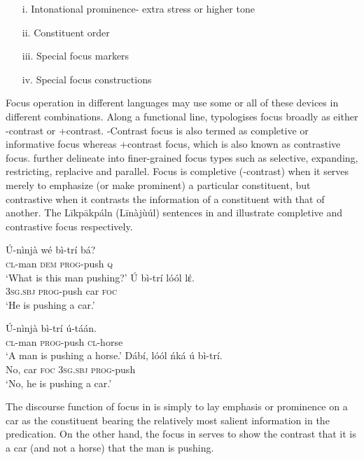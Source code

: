 \documentclass[output=paper,colorlinks,citecolor=brown]{langscibook}
\begin{document}
\begin{itemize}
    \item[i.] Intonational prominence- extra stress or higher tone
    \item[ii.] Constituent order
    \item [iii.] Special focus markers
    \item [iv.] Special focus constructions
\end{itemize}

Focus operation in different languages may use some or all of these devices in different combinations. Along a functional line, \citet[60]{Dik1981} typologises focus broadly as either -contrast or +contrast. -Contrast focus is also termed as completive or informative focus whereas +contrast focus, which is also known as contrastive focus. \citet{Akrofi-Ansah2014, Schwarz2009, SkopeteasEtAl2006} further delineate into finer-grained focus types such as selective, expanding, restricting, replacive and parallel. Focus is completive (-contrast) when it serves merely to emphasize (or make prominent) a particular constituent, but contrastive when it contrasts the information of a constituent with that of another. The Līkpākpáln (Līnàjùúl) sentences in  and  illustrate completive and contrastive focus respectively.

\ea%
    \label{ex:bisilki:4}
    \ea\label{ex:bisilki:4a}
    \gll    Ú-nìnjà	wé	bì-trí		bá?\\
            \textsc{cl-}man	\textsc{dem}	\textsc{prog-}push	\textsc{q}\\
    \glt    ‘What is this man pushing?’
    \ex\label{ex:bisilki:4b}
    \gll    Ú		bì-trí		lóól	lέ.\\
            \textsc{3sg.sbj}	\textsc{prog-}push	car	\textsc{foc}\\
    \glt    ‘He is pushing a car.’
    \z
\z

\ea%
    \label{ex:bisilki:5}
    \ea\label{ex:bisilki:5a}
    \gll    Ú-nìnjà	bì-trí		ú-táán.\\
            \textsc{cl-}man	\textsc{prog-}push	\textsc{cl-}horse\\
    \glt    ‘A man is pushing a horse.’
    \ex\label{ex:bisilki:5b}
    \gll    Dábí,	lóól	ńká	ú		bì-trí.\\
            No,	car	\textsc{foc}	\textsc{3sg.sbj}	\textsc{prog-}push\\
    \glt    ‘No, he is pushing a car.’
    \z
\z

The discourse function of focus in  is simply to lay emphasis or prominence on a car as the constituent bearing the relatively most salient information in the predication. On the other hand, the focus in  serves to show the contrast that it is a car (and not a horse) that the man is pushing.
\end{document}
